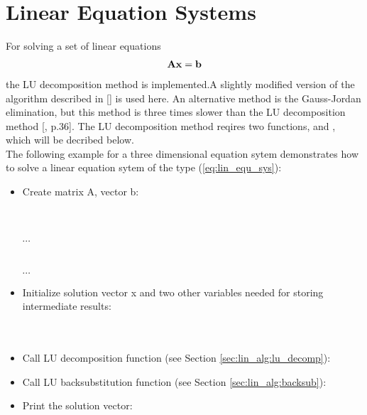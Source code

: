 \section{Linear Equation Systems}
\label{sec:lin_alg:lineqsys}


For solving a set of linear equations 
\begin{eqnarray}
\label{eq:lin_equ_sys}
{\bf A} {\bf x} = {\bf b}
\end{eqnarray}
the LU decomposition method is implemented.A slightly modified version
of the algorithm described in
[\cite{numerical_recipes_C:97}] is used here. An alternative method
is the Gauss-Jordan elimination, but this method is three times
slower than the LU decomposition method
[\cite{numerical_recipes_C:97}, p.36]. The LU decomposition method
reqires two functions,  and ,
which will be decribed below.
\vspace{0.5cm}\\
The following example for a three dimensional equation sytem 
demonstrates how to solve a linear
equation sytem of the type
(\ref{eq:lin_equ_sys}):
\begin{itemize}
\item Create matrix A, vector b: \\
   \\
  \\
  \\
  $\cdots$\\
  \\
  \\
  $\cdots$
\item Initialize solution vector x and two other variables needed for
  storing intermediate results:\\
  \\
  \\
\item Call LU decomposition function (see Section \ref{sec:lin_alg:lu_decomp}): \\
\item Call LU backsubstitution function (see Section \ref{sec:lin_alg:backsub}): \\
\item Print the solution vector:\\
\end{itemize}

